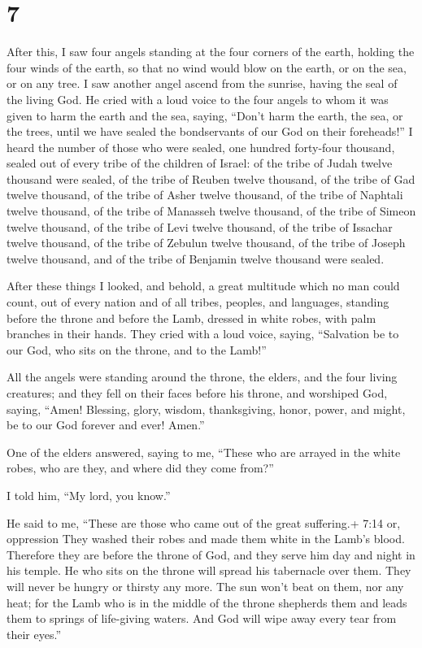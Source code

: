 \hypertarget{section-6}{%
\section{7}\label{section-6}}

 After this, I saw four angels standing at the four corners
of the earth, holding the four winds of the earth, so that no wind would
blow on the earth, or on the sea, or on any tree.  I saw
another angel ascend from the sunrise, having the seal of the living
God. He cried with a loud voice to the four angels to whom it was given
to harm the earth and the sea,  saying, ``Don't harm the
earth, the sea, or the trees, until we have sealed the bondservants of
our God on their foreheads!''  I heard the number of those
who were sealed, one hundred forty-four thousand, sealed out of every
tribe of the children of Israel:  of the tribe of Judah
twelve thousand were sealed, of the tribe of Reuben twelve thousand, of
the tribe of Gad twelve thousand,  of the tribe of Asher
twelve thousand, of the tribe of Naphtali twelve thousand, of the tribe
of Manasseh twelve thousand,  of the tribe of Simeon twelve
thousand, of the tribe of Levi twelve thousand, of the tribe of Issachar
twelve thousand,  of the tribe of Zebulun twelve thousand,
of the tribe of Joseph twelve thousand, and of the tribe of Benjamin
twelve thousand were sealed.

 After these things I looked, and behold, a great multitude
which no man could count, out of every nation and of all tribes,
peoples, and languages, standing before the throne and before the Lamb,
dressed in white robes, with palm branches in their hands. 
They cried with a loud voice, saying, ``Salvation be to our God, who
sits on the throne, and to the Lamb!''

 All the angels were standing around the throne, the
elders, and the four living creatures; and they fell on their faces
before his throne, and worshiped God,  saying, ``Amen!
Blessing, glory, wisdom, thanksgiving, honor, power, and might, be to
our God forever and ever! Amen.''

 One of the elders answered, saying to me, ``These who are
arrayed in the white robes, who are they, and where did they come
from?''

 I told him, ``My lord, you know.''

He said to me, ``These are those who came out of the great suffering.+
7:14 or, oppression They washed their robes and made them white in the
Lamb's blood.  Therefore they are before the throne of God,
and they serve him day and night in his temple. He who sits on the
throne will spread his tabernacle over them.  They will
never be hungry or thirsty any more. The sun won't beat on them, nor any
heat;  for the Lamb who is in the middle of the throne
shepherds them and leads them to springs of life-giving waters. And God
will wipe away every tear from their eyes.''

